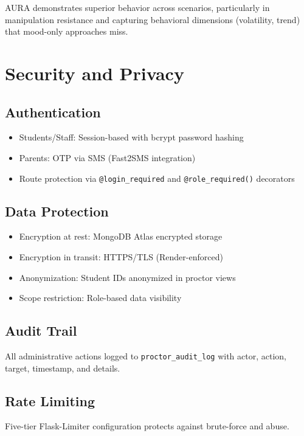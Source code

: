 \documentclass[journal]{IEEEtran}
\begin{document}
AURA demonstrates superior behavior across scenarios, particularly in manipulation resistance and capturing behavioral dimensions (volatility, trend) that mood-only approaches miss.

\section{Security and Privacy}
\label{sec:security}

\subsection{Authentication}

\begin{itemize}
    \item Students/Staff: Session-based with bcrypt password hashing
    \item Parents: OTP via SMS (Fast2SMS integration)
    \item Route protection via \texttt{@login\_required} and \texttt{@role\_required()} decorators
\end{itemize}

\subsection{Data Protection}

\begin{itemize}
    \item Encryption at rest: MongoDB Atlas encrypted storage
    \item Encryption in transit: HTTPS/TLS (Render-enforced)
    \item Anonymization: Student IDs anonymized in proctor views
    \item Scope restriction: Role-based data visibility
\end{itemize}

\subsection{Audit Trail}

All administrative actions logged to \texttt{proctor\_audit\_log} with actor, action, target, timestamp, and details.

\subsection{Rate Limiting}

Five-tier Flask-Limiter configuration protects against brute-force and abuse.
\end{document}
